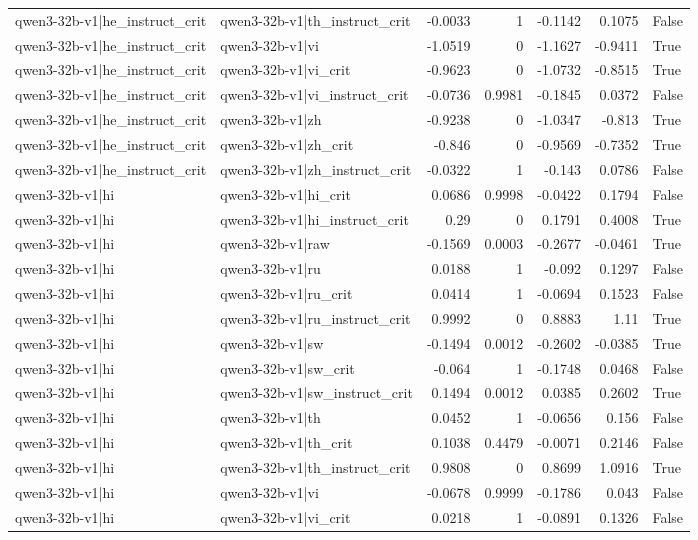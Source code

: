 \begin{table}
\begin{tabular}{l l r r r r l}
qwen3-32b-v1|he_instruct_crit & qwen3-32b-v1|th_instruct_crit & -0.0033 & 1 & -0.1142 & 0.1075 & False \\
qwen3-32b-v1|he_instruct_crit & qwen3-32b-v1|vi & -1.0519 & 0 & -1.1627 & -0.9411 & True \\
qwen3-32b-v1|he_instruct_crit & qwen3-32b-v1|vi_crit & -0.9623 & 0 & -1.0732 & -0.8515 & True \\
qwen3-32b-v1|he_instruct_crit & qwen3-32b-v1|vi_instruct_crit & -0.0736 & 0.9981 & -0.1845 & 0.0372 & False \\
qwen3-32b-v1|he_instruct_crit & qwen3-32b-v1|zh & -0.9238 & 0 & -1.0347 & -0.813 & True \\
qwen3-32b-v1|he_instruct_crit & qwen3-32b-v1|zh_crit & -0.846 & 0 & -0.9569 & -0.7352 & True \\
qwen3-32b-v1|he_instruct_crit & qwen3-32b-v1|zh_instruct_crit & -0.0322 & 1 & -0.143 & 0.0786 & False \\
qwen3-32b-v1|hi & qwen3-32b-v1|hi_crit & 0.0686 & 0.9998 & -0.0422 & 0.1794 & False \\
qwen3-32b-v1|hi & qwen3-32b-v1|hi_instruct_crit & 0.29 & 0 & 0.1791 & 0.4008 & True \\
qwen3-32b-v1|hi & qwen3-32b-v1|raw & -0.1569 & 0.0003 & -0.2677 & -0.0461 & True \\
qwen3-32b-v1|hi & qwen3-32b-v1|ru & 0.0188 & 1 & -0.092 & 0.1297 & False \\
qwen3-32b-v1|hi & qwen3-32b-v1|ru_crit & 0.0414 & 1 & -0.0694 & 0.1523 & False \\
qwen3-32b-v1|hi & qwen3-32b-v1|ru_instruct_crit & 0.9992 & 0 & 0.8883 & 1.11 & True \\
qwen3-32b-v1|hi & qwen3-32b-v1|sw & -0.1494 & 0.0012 & -0.2602 & -0.0385 & True \\
qwen3-32b-v1|hi & qwen3-32b-v1|sw_crit & -0.064 & 1 & -0.1748 & 0.0468 & False \\
qwen3-32b-v1|hi & qwen3-32b-v1|sw_instruct_crit & 0.1494 & 0.0012 & 0.0385 & 0.2602 & True \\
qwen3-32b-v1|hi & qwen3-32b-v1|th & 0.0452 & 1 & -0.0656 & 0.156 & False \\
qwen3-32b-v1|hi & qwen3-32b-v1|th_crit & 0.1038 & 0.4479 & -0.0071 & 0.2146 & False \\
qwen3-32b-v1|hi & qwen3-32b-v1|th_instruct_crit & 0.9808 & 0 & 0.8699 & 1.0916 & True \\
qwen3-32b-v1|hi & qwen3-32b-v1|vi & -0.0678 & 0.9999 & -0.1786 & 0.043 & False \\
qwen3-32b-v1|hi & qwen3-32b-v1|vi_crit & 0.0218 & 1 & -0.0891 & 0.1326 & False \\

\end{tabular}
\end{table}
